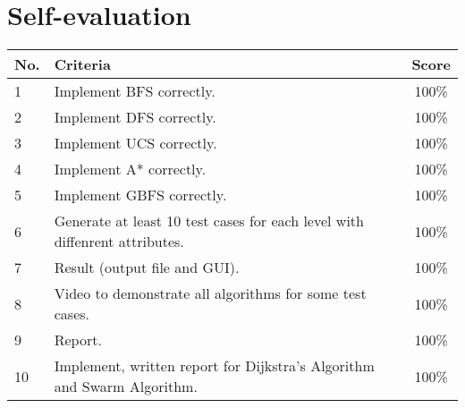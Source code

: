 \section{Self-evaluation}
\begin{center}
  \renewcommand{\arraystretch}{1.5}
  \begin{tabular}{|l|p{}|c|}
    \hline
    \textbf{No.} & \textbf{Criteria}                                                          & \textbf{Score} \\ \hline
    1            & Implement BFS correctly.                                                   & 100\%          \\ \hline
    2            & Implement DFS correctly.                                                   & 100\%          \\ \hline
    3            & Implement UCS correctly.                                                   & 100\%          \\ \hline
    4            & Implement A* correctly.                                                    & 100\%          \\ \hline
    5            & Implement GBFS correctly.                                                  & 100\%          \\ \hline
    6            & Generate at least 10 test cases for each level with diffenrent attributes. & 100\%          \\ \hline
    7            & Result (output file and GUI).                                              & 100\%          \\ \hline
    8            & Video to demonstrate all algorithms for some test cases.                   & 100\%          \\ \hline
    9            & Report.                                                                    & 100\%          \\ \hline
    10           & Implement, written report for Dijkstra's Algorithm and Swarm Algorithm.    & 100\%          \\ \hline
  \end{tabular}
\end{center}

